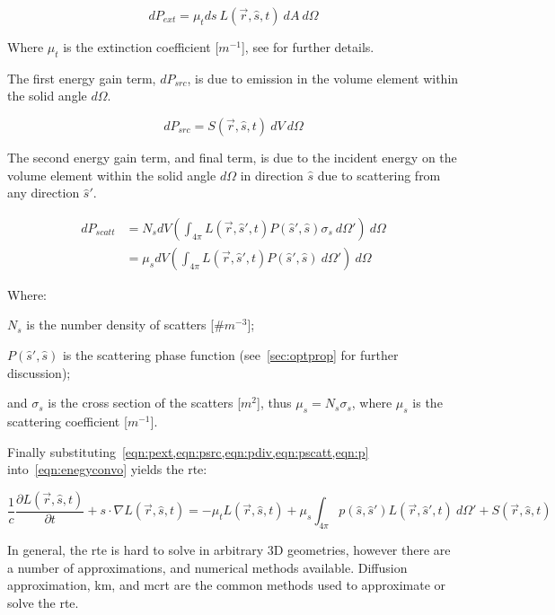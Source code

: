 \begin{equation}
	dP_{ext}=\mu_t ds\ L(\vec{r},\hat{s},t)\ dA\ d\Omega
	\label{eqn:pext}
\end{equation}

Where $\mu_t$ is the extinction coefficient [$m^{-1}$], see  for further details.

The first energy gain term, $dP_{src}$, is due to emission in the volume element within the solid angle $d\Omega$. 

\begin{equation}
	dP_{src}=S(\vec{r},\hat{s},t)\ dV\ d\Omega
	\label{eqn:psrc}
\end{equation}

The second energy gain term, and final term, is due to the incident energy on the volume element within the solid angle $d\Omega$ in direction $\hat{s}$ due to scattering from any direction $\hat{s}'$.

\begin{align}
	dP_{scatt}&=N_sdV\left(\int_{4\pi}L(\vec{r},\hat{s}',t)P(\hat{s}',\hat{s})\sigma_s\ d\Omega' \right)\ d\Omega \\
			  &=\mu_sdV\left(\int_{4\pi}L(\vec{r},\hat{s}',t)P(\hat{s}',\hat{s})\ d\Omega' \right)\ d\Omega 
			  \label{eqn:pscatt}
\end{align}

\noindent Where:

\indent $N_s$ is the number density of scatters [$\#m^{-3}$];

\indent $P(\hat{s}',\hat{s})$ is the scattering phase function (see~\cref{sec:optprop} for further discussion);

\indent and $\sigma_s$ is the cross section of the scatters [$m^2$], thus $\mu_s=N_s\sigma_s$, where $\mu_s$ is the scattering coefficient [$m^{-1}$].

\medskip


Finally substituting~\cref{eqn:pext,eqn:psrc,eqn:pdiv,eqn:pscatt,eqn:p} into~\cref{eqn:enegyconvo} yields the \gls*{rte}:

\begin{equation}
\frac{1}{c}\frac{\partial L(\vec{r},\hat{s},t)}{\partial t} + s\cdot \nabla L(\vec{r},\hat{s},t)=-\mu_tL(\vec{r},\hat{s},t)+\mu_s\int_{4\pi}p(\hat{s},\hat{s}')L(\vec{r},\hat{s}',t)\ d\Omega' + S(\vec{r},\hat{s},t)
\label{eqn:rte}
\end{equation}


In general, the \gls*{rte} is hard to solve in arbitrary 3D geometries, however there are a number of approximations, and numerical methods available. Diffusion approximation, \gls*{km}, and \gls*{mcrt} are the common methods used to approximate or solve the \gls*{rte}.

